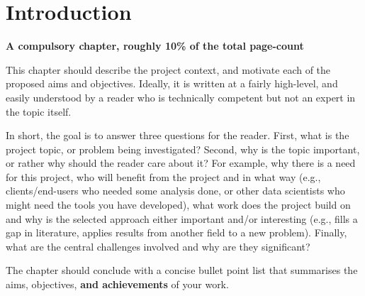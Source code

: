 \documentclass[ %
                    author={Daniel Page},
                supervisor={Dr. Andrew Calway},
                    degree={MSc},
                     title={Some Structural Guidelines for Data Science MSc Theses, Including Those With Long Titles that Run Across Multiple Lines on the Front Page},
                  subtitle={And those including an optional subtitle too, for good measure},
                      type={},
                      year={2021}]{dissertation}
\begin{document}
%

\mainmatter


\chapter{Introduction}
\label{chap:introduction}

{\bf A compulsory chapter, roughly 10\% of the total page-count}
\vspace{1cm} 

\noindent
This chapter should describe the project context, and motivate each of
the proposed aims and objectives.  Ideally, it is written at a fairly 
high-level, and easily understood by a reader who is technically 
competent but not an expert in the topic itself.

In short, the goal is to answer three questions for the reader.  First, 
what is the project topic, or problem being investigated?  Second, why 
is the topic important, or rather why should the reader care about it?  
For example, why there is a need for this project, who will benefit from the 
project and in what way (e.g., clients/end-users who needed some analysis
done, or other data scientists who might need the tools you have developed), what 
work does the project build on and why is the selected approach either
important and/or interesting (e.g., fills a gap in literature, applies
results from another field to a new problem).  Finally, what are the 
central challenges involved and why are they significant? 
 
The chapter should conclude with a concise bullet point list that 
summarises the aims, objectives, {\bf and achievements}\/ of your work. 

\end{document}
